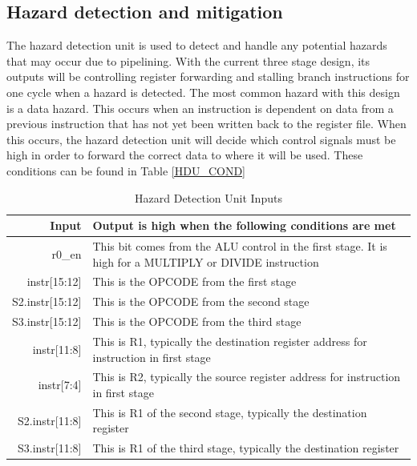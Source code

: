     \subsection{Hazard detection and mitigation}    
    	The hazard detection unit is used to detect and handle any potential hazards that may occur due to pipelining. With the current three stage design, its outputs will be controlling register forwarding and stalling branch instructions for one cycle when a hazard is detected.
    	The most common hazard with this design is a data hazard. This occurs when an instruction is dependent on data from a previous instruction that has not yet been written back to the register file. When this occurs, the hazard detection unit will decide which control signals must be high in order to forward the correct data to where it will be used. These conditions can be found in Table \ref{HDU_COND}
    	
		\begin{table}[htpb]
		        \caption{Hazard Detection Unit Inputs}
		        \label{HDU_IN}
		        \centering
		        \begin{tabular}{r | p{6cm}}
		        Input          & Output is high when the following conditions are met\\
		        \hline
		        \hline
		        r0\_en			& This bit comes from the ALU control in the first stage. It is high for a MULTIPLY or DIVIDE instruction \\
		        \hline
		        instr[15:12] 	& This is the OPCODE from the first stage \\
		        \hline
		        S2.instr[15:12]	& This is the OPCODE from the second stage \\
		        \hline
		        S3.instr[15:12]	& This is the OPCODE from the third stage \\
		        \hline
		        instr[11:8]		& This is R1, typically the destination register address for instruction in first stage \\
		        \hline
		        instr[7:4]		& This is R2, typically the source register address for instruction in first stage \\
		        \hline
		        S2.instr[11:8]	& This is R1 of the second stage, typically the destination register \\
		        \hline		        		        		        
		        S3.instr[11:8] 	& This is R1 of the third stage, typically the destination register \\
		        \hline
		        \end{tabular}
		\end{table}
		    	
